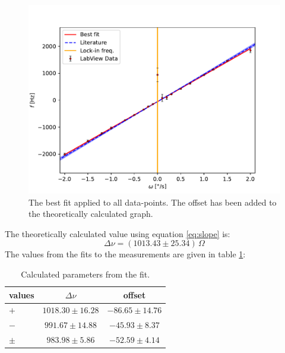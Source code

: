 \begin{figure}[h!]
    \centering
    \includegraphics[width=\textwidth]{Gyroscope/Report/plots/slope.pdf}
    \caption{The best fit applied to all data-points. The offset has been added to the theoretically calculated graph.}
    \label{fig:measurements}
\end{figure}
The theoretically calculated value using equation \ref{eq:slope} is:
$$\Delta \nu = (1013.43 \pm 25.34)\, \Omega $$
The values from the fits to the measurements are given in table \ref{tab:measurements}:
\begin{table}[h!]
\centering\begin{tabular}{l|c|c}
\hline values & $\Delta \nu$ & offset \\ \hline
     $+$ & $1018.30 \pm 16.28$ & $-86.65 \pm 14.76$\\
     $-$ & $991.67 \pm 14.88$ & $-45.93 \pm 8.37$ \\
     $\pm$ & $983.98 \pm 5.86$ & $-52.59 \pm 4.14$
\end{tabular}
\caption{Calculated parameters from the fit.}
\label{tab:measurements}
\end{table}

